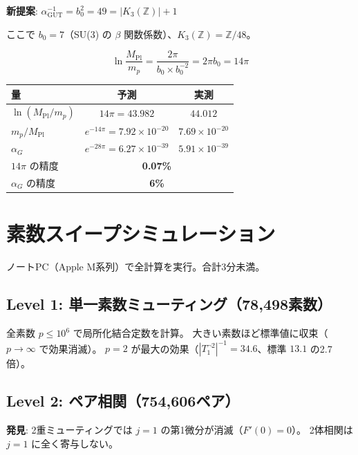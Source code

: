 \documentclass[11pt,a4paper]{article}
\begin{document}
\textbf{新提案}: $\alpha_{\mathrm{GUT}}^{-1} = b_0^2 = 49 = |K_3(\mathbb{Z})| + 1$

ここで $b_0 = 7$（SU(3) の $\beta$ 関数係数）、$K_3(\mathbb{Z}) = \mathbb{Z}/48$。

$$\ln\frac{M_{\mathrm{Pl}}}{m_p} = \frac{2\pi}{b_0 \times b_0^{-2}} = 2\pi b_0 = 14\pi$$

\begin{center}
\begin{tabular}{lcc}
\toprule
量 & 予測 & 実測 \\
\midrule
$\ln(M_{\mathrm{Pl}}/m_p)$ & $14\pi = 43.982$ & $44.012$ \\
$m_p/M_{\mathrm{Pl}}$ & $e^{-14\pi} = 7.92\times 10^{-20}$ & $7.69\times 10^{-20}$ \\
$\alpha_G$ & $e^{-28\pi} = 6.27\times 10^{-39}$ & $5.91\times 10^{-39}$ \\
\midrule
$14\pi$ の精度 & \multicolumn{2}{c}{\textbf{0.07\%}} \\
$\alpha_G$ の精度 & \multicolumn{2}{c}{\textbf{6\%}} \\
\bottomrule
\end{tabular}
\end{center}

\section{素数スイープシミュレーション}

ノートPC（Apple M系列）で全計算を実行。合計3分未満。

\subsection{Level 1: 単一素数ミューティング（78,498素数）}

全素数 $p \leq 10^6$ で局所化結合定数を計算。
大きい素数ほど標準値に収束（$p \to \infty$ で効果消滅）。
$p = 2$ が最大の効果（$|T_1^{\neg 2}|^{-1} = 34.6$、標準 $13.1$ の2.7倍）。

\subsection{Level 2: ペア相関（754,606ペア）}

\textbf{発見}: 2重ミューティングでは $j=1$ の第1微分が消滅（$F'(0) = 0$）。
2体相関は $j=1$ に全く寄与しない。
\end{document}
